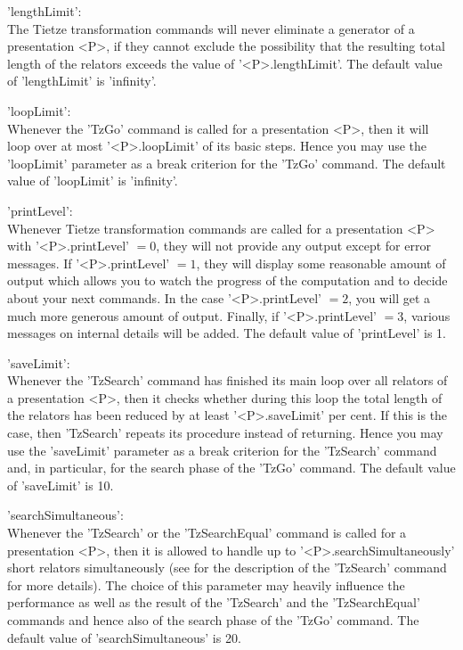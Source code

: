 'lengthLimit': \\
        The  Tietze  transformation  commands  will  never  eliminate   a
        generator of a presentation  <P>,  if  they  cannot  exclude  the
        possibility  that  the  resulting total  length  of  the relators
        exceeds  the value of  '<P>.lengthLimit'.  The default  value  of
        'lengthLimit' is 'infinity'.

'loopLimit': \\
        Whenever the 'TzGo'  command  is called  for a  presentation <P>,
        then  it  will  loop  over  at  most '<P>.loopLimit' of its basic
        steps.  Hence you  may  use the  'loopLimit' parameter as a break
        criterion  for   the  'TzGo'   command.  The   default  value  of
        'loopLimit' is 'infinity'.

'printLevel': \\
        Whenever   Tietze  transformation  commands  are  called  for   a
        presentation <P> with  '<P>.printLevel'  $=  0$,  they  will  not
        provide any output except for error messages. If '<P>.printLevel'
        $=  1$, they will display some  reasonable amount of output which
        allows you to watch the progress of the computation and to decide
        about your next commands. In the case '<P>.printLevel' $= 2$, you
        will  get  a much more  generous amount  of output.  Finally,  if
        '<P>.printLevel' $= 3$, various messages on internal details will
        be added. The default value of 'printLevel' is 1.

'saveLimit': \\
        Whenever the  'TzSearch' command has finished its main loop  over
        all relators of a presentation <P>, then it checks whether during
        this loop the total length of the relators has been reduced by at
        least  '<P>.saveLimit'  per  cent.  If  this is  the  case,  then
        'TzSearch' repeats its procedure instead of returning.  Hence you
        may use the 'saveLimit' parameter  as a  break  criterion for the
        'TzSearch' command  and, in  particular,  for the search phase of
        the 'TzGo' command. The default value of 'saveLimit' is 10.

'searchSimultaneous': \\
        Whenever the 'TzSearch'  or the 'TzSearchEqual' command is called
        for  a  presentation  <P>,  then it is  allowed  to handle  up to
        '<P>.searchSimultaneously' short relators simultaneously (see for
        the description of the 'TzSearch' command for more details).  The
        choice of this parameter may heavily influence the performance as
        well  as  the result of the  'TzSearch'  and  the 'TzSearchEqual'
        commands and  hence also  of  the  search  phase  of  the  'TzGo'
        command. The default value of 'searchSimultaneous' is 20.

